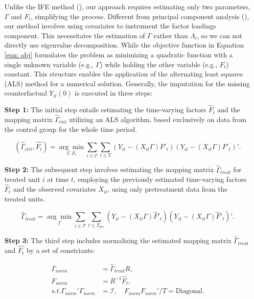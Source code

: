 \documentclass[12pt]{article}
\begin{document}
Unlike the IFE method (\cite{bai2009panel,xu2017generalized}), our approach requires estimating only two parameters, $\Gamma$ and $F_t$, simplifying the process. Different from principal component analysis (\cite{jolliffe2002principal,stock2002forecasting}), our method involves using covariates to instrument the factor loadings component. This necessitates the estimation of $\Gamma$ rather than $\Lambda_i$, so we can not directly use eigenvalue decomposition. While the objective function in Equation \ref{eqn: obj} formulates the problem as minimizing a quadratic function with a single unknown variable (e.g., $\Gamma$) while holding the other variable (e.g., $F_t$) constant. This structure enables the application of the alternating least squares (ALS) method for a numerical solution. Generally, the imputation for the missing counterfactual $Y_{it}(0)$ is executed in three steps:

\textbf{Step 1:} The initial step entails estimating the time-varying factors $\hat{F}_t$ and the mapping matrix $\hat{\Gamma}_{\text{ctrl}}$ utilizing an ALS algorithm, based exclusively on data from the control group for the whole time period.

\begin{equation}
(\hat{\Gamma}_{ctrl}, \hat{F_t}) = \underset{\Gamma, F_t}{\arg\min} \sum_{i \in \mathcal{C}} \sum_{t \leq T}\left( Y_{it} - (X_{it}\Gamma) F'_{t} \right)\left( Y_{it} - (X_{it}\Gamma) F'_{t} \right)'.
\label{eq: optimization}
\end{equation}

\textbf{Step 2:} The subsequent step involves estimating the mapping matrix $\hat{\Gamma}_{treat}$ for treated unit $i$ at time $t$, employing the previously estimated time-varying factors $\hat{F}_t$ and the observed covariates $X_{it}$, using only pretreatment data from the treated units.

\begin{equation}
\hat{\Gamma}_{treat} = \underset{\Gamma}{\arg\min} \sum_{i \in \mathcal{T}} \sum_{t \leq T_{pre}} \left( Y_{it} - (X_{it} \Gamma) \hat{F}'_{t} \right) \left( Y_{it} - (X_{it} \Gamma) \hat{F}'_{t} \right)'.
\end{equation}

\textbf{Step 3:} The third step includes normalizing the estimated mapping matrix $\hat{\Gamma}_{treat}$ and $\hat{F_t}$ by a set of constriants:

\begin{equation}
\label{eqn: normalization}
\begin{aligned}
\Gamma_{norm} &= \hat{\Gamma}_{treat} R, \\
F_{norm} &= R^{-1} \hat{F}_t, \\
s.t. \Gamma_{norm}'\Gamma_{norm} &= \mathcal{I}, \quad F_{norm} F_{norm}'/T = \text{Diagonal}.
\end{aligned}
\end{equation}
\end{document}
